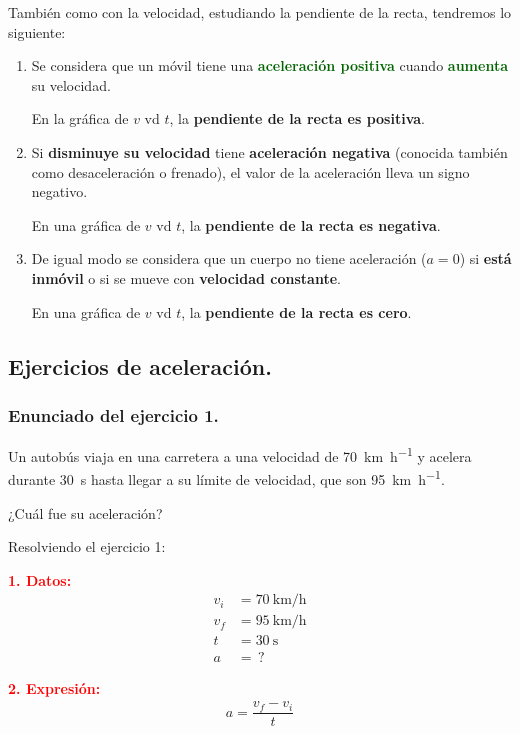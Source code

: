 \documentclass[14pt]{extarticle}
\newcommand{\textocolor}[2]{\textbf{\textcolor{#1}{#2}}}
\begin{document}
También como con la velocidad, estudiando la pendiente de la recta, tendremos lo siguiente:
\begin{enumerate}[label=\alph*)]
\item Se considera que un móvil tiene una \textocolor{darkgreen}{aceleración positiva}  cuando \textocolor{darkgreen}{aumenta} su velocidad.

En la gráfica de $v$ vd $t$, la \textocolor{coquelicot}{pendiente de la recta es positiva}.
\item Si \textocolor{blue-violet}{disminuye su velocidad} tiene \textocolor{blue-violet}{aceleración negativa} (conocida también como desaceleración o frenado), el valor de la aceleración lleva un signo negativo.

En una gráfica de $v$ vd $t$, la \textocolor{awesome}{pendiente de la recta es negativa}.
\item De igual modo se considera que un cuerpo no tiene aceleración ($a = 0$)  si \textocolor{cerise}{está inmóvil} o si se mueve con \textocolor{bulgarianrose}{velocidad constante}.

En una gráfica de $v$ vd $t$, la \textocolor{cadetblue!60!black}{pendiente de la recta es cero}.
\end{enumerate}

\subsection{Ejercicios de aceleración.}

\subsubsection{Enunciado del ejercicio 1.}

Un autobús viaja en una carretera a una velocidad de \SI{70}{\kilo\meter\per\hour} y acelera durante \SI{30}{\second} hasta llegar a su límite de velocidad, que son \SI{95}{\kilo\meter\per\hour}.

¿Cuál fue su aceleración?

\vspace*{0.3cm}
Resolviendo el ejercicio 1:

\vspace*{0.3cm}
\begin{minipage}[t]{0.4\linewidth}
\textocolor{red}{1. Datos:}
\begin{align*}
v_{i} &= \SI{70}{\kilo\meter\per\hour} \\[0.5em] 
v_{f} &= \SI{95}{\kilo\meter\per\hour} \\[0.5em] 
t &= \SI{30}{\second} \\[0.5em] 
a &= \, ?
\end{align*}
\end{minipage}
\hspace{0.5cm}
\begin{minipage}[t]{0.4\linewidth}
\textocolor{red}{2. Expresión:}
\begin{align*}
a = \dfrac{v_{f} - v_{i}}{t}
\end{align*}
\end{minipage}
\end{document}
